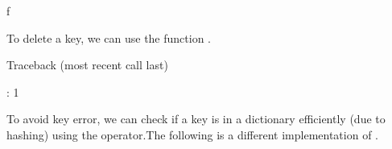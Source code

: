 \documentclass[letterpaper,10pt,english]{sphinxmanual}
\begin{document}
\begin{sphinxVerbatim}[commandchars=\\\{\}]
\PYGZsq{}f\PYGZsq{}
\end{sphinxVerbatim}

To delete a key, we can use the function .

\begin{sphinxVerbatim}[commandchars=\\\{\}]
 \PYG{p}{[}\PYG{p}{]}
\PYG{p}{[}\PYG{p}{]}
\end{sphinxVerbatim}

\begin{sphinxVerbatim}[commandchars=\\\{\}]
Traceback (most recent call last)
  
  \PYG{p}{[}\PYG{p}{]}
 \PYG{p}{[}\PYG{p}{]}

: \PYGZhy{}1
\end{sphinxVerbatim}

To avoid key error, we can check if a key is in a dictionary efficiently (due to hashing) using the  operator.The following is a different implementation of .
\end{document}
